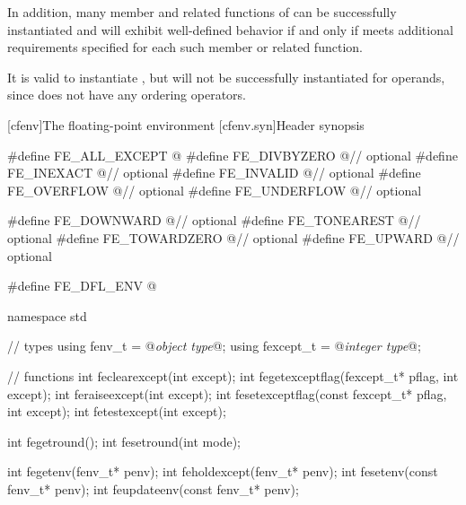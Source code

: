 \pnum
In addition, many member and related functions of
can be successfully instantiated
and will exhibit well-defined behavior if and only if
 meets additional requirements specified for each such member
or related function.

\pnum
\begin{example}
It is valid to instantiate
,
but
will not be successfully instantiated for
operands, since
does not have any ordering operators.
\end{example}

[cfenv]{The floating-point environment}
[cfenv.syn]{Header  synopsis}

%
%
%
%
%
%
%
%
%
%
%
%
%
%
%
%
%
%
%
%
%
%
%
%
%
\begin{codeblock}
#define FE_ALL_EXCEPT @\seebelow@
#define FE_DIVBYZERO @\seebelow@    // optional
#define FE_INEXACT @\seebelow@      // optional
#define FE_INVALID @\seebelow@      // optional
#define FE_OVERFLOW @\seebelow@     // optional
#define FE_UNDERFLOW @\seebelow@    // optional

#define FE_DOWNWARD @\seebelow@     // optional
#define FE_TONEAREST @\seebelow@    // optional
#define FE_TOWARDZERO @\seebelow@   // optional
#define FE_UPWARD @\seebelow@       // optional

#define FE_DFL_ENV @\seebelow@

namespace std {
  // types
  using fenv_t    = @\textit{object type}@;
  using fexcept_t = @\textit{integer type}@;

  // functions
  int feclearexcept(int except);
  int fegetexceptflag(fexcept_t* pflag, int except);
  int feraiseexcept(int except);
  int fesetexceptflag(const fexcept_t* pflag, int except);
  int fetestexcept(int except);

  int fegetround();
  int fesetround(int mode);

  int fegetenv(fenv_t* penv);
  int feholdexcept(fenv_t* penv);
  int fesetenv(const fenv_t* penv);
  int feupdateenv(const fenv_t* penv);
}
\end{codeblock}

